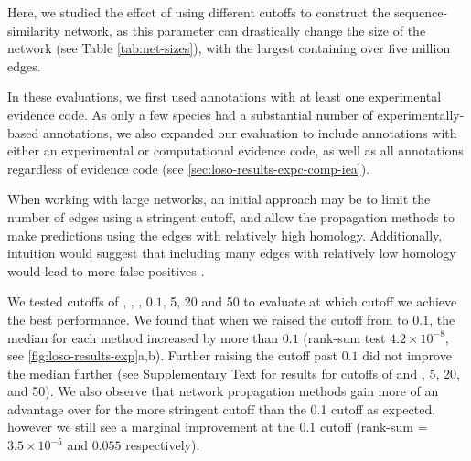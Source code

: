 Here, we studied the effect of using different \eval cutoffs to construct the sequence-similarity network, as this parameter can drastically change the size of the network (see Table \ref{tab:net-sizes}), with the largest \SSN containing over five million edges. 
 

In these evaluations, we first used annotations with at least one experimental evidence code. 
As only a few species had a substantial number of experimentally-based annotations, we also expanded our evaluation to include annotations with either an experimental or computational evidence code, as well as all annotations regardless of evidence code (see \cref{sec:loso-results-expc-comp-iea}).



When working with large networks, an initial approach may be to limit the number of edges using a stringent cutoff, and allow the propagation methods to make predictions using the edges with relatively high homology. 
Additionally, intuition would suggest that including many edges with relatively low homology would lead to more false positives . 

We tested cutoffs of , , , $0.1$, 5, 20 and 50 to evaluate at which cutoff we achieve the best performance.
We found that when we raised the \eval cutoff from  to $0.1$, the median \fmax for each method increased by more than $0.1$ (rank-sum test \pval $4.2\times{}10^{-8}$, see \cref{fig:loso-results-exp}a,b).
Further raising the \eval cutoff past $0.1$ did not improve the median \fmax further (see Supplementary Text for results for \eval cutoffs of  and , 5, 20, and 50).
We also observe that network propagation methods gain more of an advantage over \localplus for the more stringent  cutoff than the 0.1 cutoff as expected, however we still see a marginal improvement at the 0.1 cutoff (rank-sum \pval = $3.5\times{}10^{-5}$ and $0.055$ respectively).

